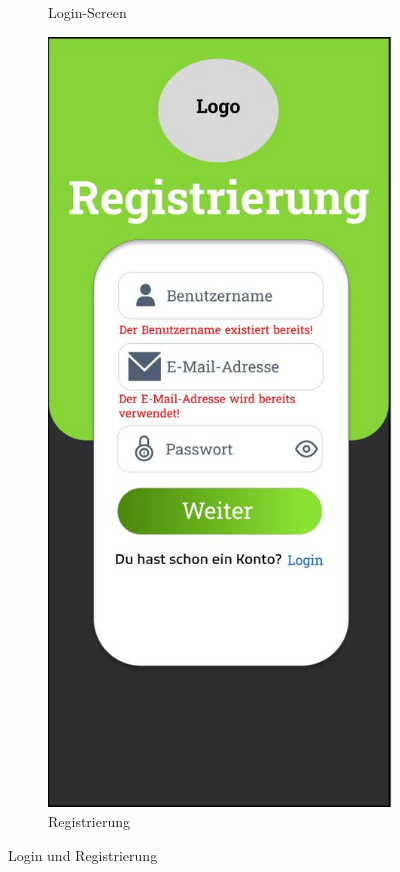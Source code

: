 \begin{figure}[htbp]
\begin{subfigure}[b]{0.45\linewidth}
          \caption{Login-Screen}
          \label{fig:login-screen}
        \end{subfigure}
        \hfill
        \begin{subfigure}[b]{0.45\linewidth}
          \centering
          \includegraphics[width=\linewidth]{images/Mockups/Registrierung.JPG}
          \caption{Registrierung}
          \label{fig:registrierung}
        \end{subfigure}
        \caption{Login und Registrierung}
      \end{figure}

